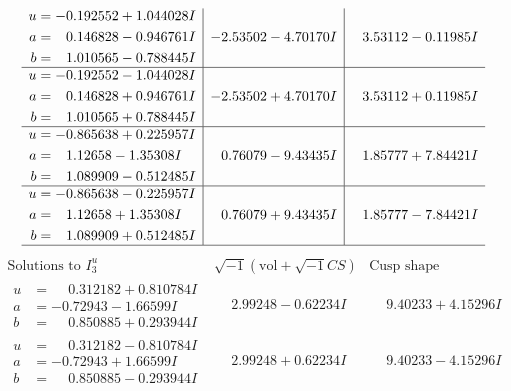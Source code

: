 \documentclass[1p]{elsarticle_modified}
\theoremstyle{definition}
\newcommand{\I}{\sqrt{-1}}
\begin{document}
$$\begin{array}{c|c|c}
\begin{aligned}
u &= -0.192552 + 1.044028 I \\
a &= \phantom{-}0.146828 - 0.946761 I \\
b &= \phantom{-}1.010565 - 0.788445 I\end{aligned}
 & -2.53502 - 4.70170 I & \phantom{-}3.53112 - 0.11985 I \\ \hline\begin{aligned}
u &= -0.192552 - 1.044028 I \\
a &= \phantom{-}0.146828 + 0.946761 I \\
b &= \phantom{-}1.010565 + 0.788445 I\end{aligned}
 & -2.53502 + 4.70170 I & \phantom{-}3.53112 + 0.11985 I \\ \hline\begin{aligned}
u &= -0.865638 + 0.225957 I \\
a &= \phantom{-}1.12658 - 1.35308 I \\
b &= \phantom{-}1.089909 - 0.512485 I\end{aligned}
 & \phantom{-}0.76079 - 9.43435 I & \phantom{-}1.85777 + 7.84421 I \\ \hline\begin{aligned}
u &= -0.865638 - 0.225957 I \\
a &= \phantom{-}1.12658 + 1.35308 I \\
b &= \phantom{-}1.089909 + 0.512485 I\end{aligned}
 & \phantom{-}0.76079 + 9.43435 I & \phantom{-}1.85777 - 7.84421 I\\
 \hline 
 \end{array}$$\newpage$$\begin{array}{c|c|c}  
\text{Solutions to }I^u_{3}& \I (\text{vol} + \sqrt{-1}CS) & \text{Cusp shape}\\
 \hline 
\begin{aligned}
u &= \phantom{-}0.312182 + 0.810784 I \\
a &= -0.72943 - 1.66599 I \\
b &= \phantom{-}0.850885 + 0.293944 I\end{aligned}
 & \phantom{-}2.99248 - 0.62234 I & \phantom{-}9.40233 + 4.15296 I \\ \hline\begin{aligned}
u &= \phantom{-}0.312182 - 0.810784 I \\
a &= -0.72943 + 1.66599 I \\
b &= \phantom{-}0.850885 - 0.293944 I\end{aligned}
 & \phantom{-}2.99248 + 0.62234 I & \phantom{-}9.40233 - 4.15296 I \\ \hline\begin{aligned}

\end{aligned}
\end{array}$$
\end{document}
